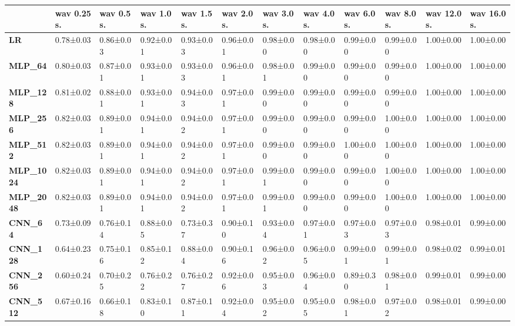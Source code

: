 \begin{tabular}{llllllllllll}
\toprule
{} & wav 0.25 s. & wav 0.5 s. & wav 1.0 s. & wav 1.5 s. & wav 2.0 s. & wav 3.0 s. & wav 4.0 s. & wav 6.0 s. & wav 8.0 s. & wav 12.0 s. & wav 16.0 s. \\
\midrule
\textbf{LR            } &   0.78±0.03 &  0.86±0.03 &  0.92±0.01 &  0.93±0.03 &  0.96±0.01 &  0.98±0.00 &  0.98±0.00 &  0.99±0.00 &  0.99±0.00 &   1.00±0.00 &   1.00±0.00 \\
\textbf{MLP\_64        } &   0.80±0.03 &  0.87±0.01 &  0.93±0.01 &  0.93±0.03 &  0.96±0.01 &  0.98±0.01 &  0.99±0.00 &  0.99±0.00 &  0.99±0.00 &   1.00±0.00 &   1.00±0.00 \\
\textbf{MLP\_128       } &   0.81±0.02 &  0.88±0.01 &  0.93±0.01 &  0.94±0.03 &  0.97±0.01 &  0.99±0.00 &  0.99±0.00 &  0.99±0.00 &  0.99±0.00 &   1.00±0.00 &   1.00±0.00 \\
\textbf{MLP\_256       } &   0.82±0.03 &  0.89±0.01 &  0.94±0.01 &  0.94±0.02 &  0.97±0.01 &  0.99±0.00 &  0.99±0.00 &  0.99±0.00 &  1.00±0.00 &   1.00±0.00 &   1.00±0.00 \\
\textbf{MLP\_512       } &   0.82±0.03 &  0.89±0.01 &  0.94±0.01 &  0.94±0.02 &  0.97±0.01 &  0.99±0.00 &  0.99±0.00 &  1.00±0.00 &  1.00±0.00 &   1.00±0.00 &   1.00±0.00 \\
\textbf{MLP\_1024      } &   0.82±0.03 &  0.89±0.01 &  0.94±0.01 &  0.94±0.02 &  0.97±0.01 &  0.99±0.01 &  0.99±0.00 &  0.99±0.00 &  1.00±0.00 &   1.00±0.00 &   1.00±0.00 \\
\textbf{MLP\_2048      } &   0.82±0.03 &  0.89±0.01 &  0.94±0.01 &  0.94±0.02 &  0.97±0.01 &  0.99±0.01 &  0.99±0.00 &  0.99±0.00 &  1.00±0.00 &   1.00±0.00 &   1.00±0.00 \\
\textbf{CNN\_64        } &   0.73±0.09 &  0.76±0.14 &  0.88±0.05 &  0.73±0.37 &  0.90±0.10 &  0.93±0.04 &  0.97±0.01 &  0.97±0.03 &  0.97±0.03 &   0.98±0.01 &   0.99±0.00 \\
\textbf{CNN\_128       } &   0.64±0.23 &  0.75±0.16 &  0.85±0.12 &  0.88±0.04 &  0.90±0.16 &  0.96±0.02 &  0.96±0.05 &  0.99±0.01 &  0.99±0.01 &   0.98±0.02 &   0.99±0.01 \\
\textbf{CNN\_256       } &   0.60±0.24 &  0.70±0.25 &  0.76±0.22 &  0.76±0.27 &  0.92±0.06 &  0.95±0.03 &  0.96±0.04 &  0.89±0.30 &  0.98±0.01 &   0.99±0.01 &   0.99±0.00 \\
\textbf{CNN\_512       } &   0.67±0.16 &  0.66±0.18 &  0.83±0.10 &  0.87±0.11 &  0.92±0.04 &  0.95±0.02 &  0.95±0.05 &  0.98±0.01 &  0.97±0.02 &   0.98±0.01 &   0.99±0.00 \\

\end{tabular}
